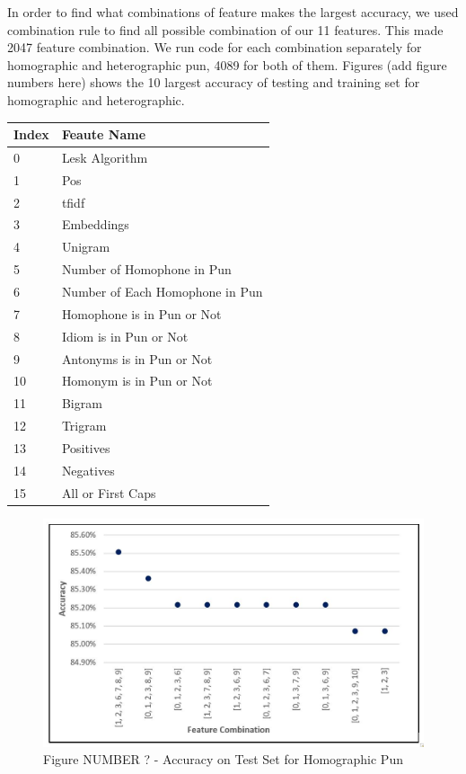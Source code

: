 \documentclass{article}
\begin{document}
In order to find what combinations of feature makes the largest accuracy, we used combination rule to find all possible combination of our 11 features. This made 2047 feature combination. We run code for each combination separately for homographic and heterographic pun, 4089 for both of them. Figures (add figure numbers here) shows the 10 largest accuracy of testing and training set for homographic and heterographic.\\



\begin{center}
\begin{tabular}{ |l|l| } 
\hline
\textbf{Index} 	&	\textbf{Feaute Name}	\\
\hline
0	&	Lesk Algorithm	\\
1	&	Pos	\\
2	&	tfidf	\\
3	&	Embeddings	\\
4	&	Unigram	\\
5	&	Number of Homophone in Pun	\\
6	&	Number of Each Homophone in Pun	\\
7	&	Homophone is in Pun or Not	\\
8	&	Idiom is in Pun or Not	\\
9	&	Antonyms is in Pun or Not	\\
10	&	Homonym is in Pun or Not	\\
11	&	Bigram	\\
12	&	Trigram	\\
13	&	Positives	\\
14	&	Negatives	\\
15	&	All or First Caps	\\
\hline
\end{tabular}
\end{center}



\begin{figure}
  \includegraphics{figures/Accuracy_on_Test_Set_for_Homographic_Pun.JPG}
  \caption{Figure NUMBER ? - Accuracy on Test Set for Homographic Pun}
  \label{fig:boat1}
\end{figure}
\end{document}

